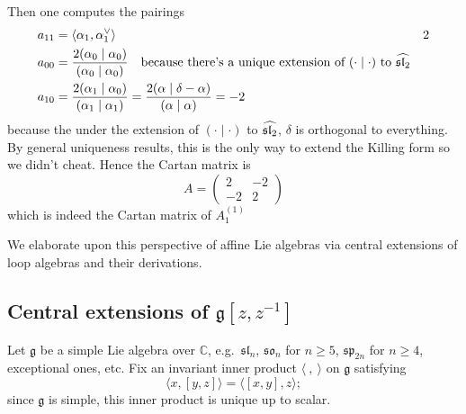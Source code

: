 \documentclass[12pt]{article}
\begin{document}
\begin{example}
Then one computes the pairings \begin{align*}
    a_{11} &= \langle \alpha_1, \alpha_1^\vee \rangle & 2 \\
    a_{00} &= \frac{2(\alpha_0 \mid \alpha_0)}{(\alpha_0 \mid \alpha_0)} \texty{because there's a unique extension of $(\cdot \mid \cdot)$ to $\widehat{\sl_2}$} \\
    a_{10} &= \frac{2(\alpha_1 \mid \alpha_0)}{(\alpha_1 \mid \alpha_1)} = \frac{2(\alpha \mid \delta - \alpha)}{(\alpha \mid \alpha)} = -2 \\
\end{align*} because the under the extension of $(\cdot \mid \cdot)$ to $\widehat{\sl_2}$, $\delta$ is orthogonal to everything. By general uniqueness results, this is the only way to extend the Killing form so we didn't cheat. Hence the Cartan matrix is \[
    A = \begin{pmatrix}
        2 & -2 \\
        -2 & 2
    \end{pmatrix}
\] which is indeed the Cartan matrix of $A_1^{(1)}$
\end{example}

We elaborate upon this perspective of affine Lie algebras via central extensions of loop algebras and their derivations.

\subsection*{Central extensions of $\mathfrak{g}[z,z^{-1}]$}

Let $\mathfrak{g}$ be a simple Lie algebra over $\mathbb{C}$, e.g.\ $\mathfrak{sl}_n$, $\mathfrak{so}_n$ for $n \geq 5$, $\mathfrak{sp}_{2n}$ for $n \geq 4$, exceptional ones, etc. Fix an invariant inner product $\langle\ ,\ \rangle$ on $\mathfrak{g}$ satisfying
\[
    \langle x, [y,z]\rangle = \langle [x,y], z\rangle;
\]
since $\mathfrak{g}$ is simple, this inner product is unique up to scalar.
\end{document}
